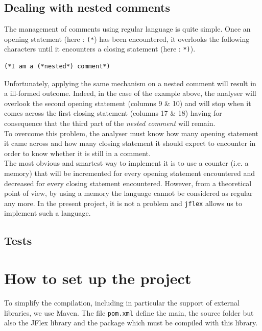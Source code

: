 \documentclass[a4paper,11pt]{article}
\begin{document}
  \subsection{Dealing with nested comments}
    The management of comments using regular language is quite simple. Once an opening statement (here : \verb|(*|) has been encountered, it overlooks the following characters until it encounters a closing statement (here : \verb|*)|).
    \begin{lstlisting}
(*I am a (*nested*) comment*)
    \end{lstlisting}
    Unfortunately, applying the same mechanism on a nested comment will result in a ill-formed outcome. Indeed, in the case of the example above, the analyser will overlook the second opening statement (columns 9 \& 10) and will stop when it comes across the first closing statement (columns 17 \& 18) having for consequence that the third part of the \textit{nested comment} will remain.\\
    To overcome this problem, the analyser must know how many opening statement it came across and how many closing statement it should expect to encounter in order to know whether it is still in a comment.\\
    The most obvious and smartest way to implement it is to use a counter (i.e. a memory) that will be incremented for every opening statement encountered and decreased for every closing statement encountered. However, from a theoretical point of view, by using a memory the language cannot be considered as regular any more. In the present project, it is not a problem and \verb|jflex| allows us to implement such a language.
    
  \subsection{Tests}
    
    
    
    

\section{How to set up the project}
  To simplify the compilation, including in particular the support of external libraries, we use Maven.  The file \verb|pom.xml| define the main, the source folder but also the JFlex library and the package which must be compiled with this library.
  
\end{document}
